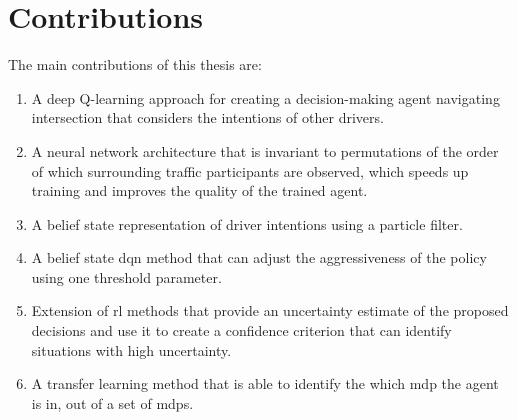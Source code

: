 \section{Contributions}
\label{sec:contributions}
The main contributions of this thesis are:
\begin{enumerate}
	\item A deep Q-learning approach for creating a decision-making agent navigating intersection that considers the intentions of other drivers. 
	\item A neural network architecture that is invariant to permutations of the order of which surrounding traffic participants are observed, which speeds up training and improves the quality of the trained agent. 
	\item A belief state representation of driver intentions using a particle filter.
	\item A belief state \gls{dqn} method that can adjust the aggressiveness of the policy using one threshold parameter.
	\item Extension of \gls{rl} methods that provide an uncertainty estimate of the proposed decisions and use it to create a confidence criterion that can identify situations with high uncertainty. 
	\item A transfer learning method that is able to identify the which \gls{mdp} the agent is in, out of a set of \gls{mdp}s.
\end{enumerate}



